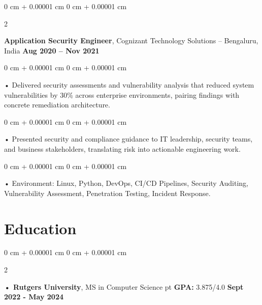 \documentclass[10pt, letterpaper]{article}
\newenvironment{onecolentry}{
    \begin{adjustwidth}{
        0 cm + 0.00001 cm
    }{
        0 cm + 0.00001 cm
    }
}{
    \end{adjustwidth}
} %
\newenvironment{twocolentry}[2][]{
    \onecolentry
    \def\secondColumn{#2}
    \setcolumnwidth{\fill, 4.5 cm}
    \begin{paracol}{2}
}{
    \switchcolumn \raggedleft \secondColumn
    \end{paracol}
    \endonecolentry
} %
\begin{document}
        \begin{twocolentry}{
            \textbf{Aug 2020 – Nov 2021}
        }
            \vspace{2 pt }
            \textbf{Application Security Engineer}, Cognizant Technology Solutions -- Bengaluru, India\end{twocolentry}
        \begin{onecolentry}
             • Delivered security assessments and vulnerability analysis that reduced system vulnerabilities by 30\% across enterprise environments, pairing findings with concrete remediation architecture.
        \end{onecolentry}
        \begin{onecolentry}
             • Presented security and compliance guidance to IT leadership, security teams, and business stakeholders, translating risk into actionable engineering work.
        \end{onecolentry}
        \begin{onecolentry}
             • Environment: Linux, Python, DevOps, CI/CD Pipelines, Security Auditing, Vulnerability Assessment, Penetration Testing, Incident Response.
        \end{onecolentry}
    \vspace{2 pt }
        \section{Education}
        \vspace{2 pt }
        \begin{twocolentry}{
            \textbf{Sept 2022 - May 2024}
        }
            \textbf{ • Rutgers University}, MS in Computer Science  pt \textbf{GPA:} 3.875/4.0  \end{twocolentry}
\end{document}
